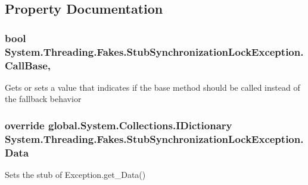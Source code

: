 \subsection{Property Documentation}
\hypertarget{class_system_1_1_threading_1_1_fakes_1_1_stub_synchronization_lock_exception_a0f2850792a01244a327d73f420cf38c0}{
\subsubsection[{Call\-Base}]{\setlength{\rightskip}{0pt plus 5cm}bool System.\-Threading.\-Fakes.\-Stub\-Synchronization\-Lock\-Exception.\-Call\-Base\hspace{0.3cm}{\ttfamily [get]}, {\ttfamily [set]}}}\label{class_system_1_1_threading_1_1_fakes_1_1_stub_synchronization_lock_exception_a0f2850792a01244a327d73f420cf38c0}


Gets or sets a value that indicates if the base method should be called instead of the fallback behavior

\hypertarget{class_system_1_1_threading_1_1_fakes_1_1_stub_synchronization_lock_exception_a7c10b32b6239c528fecbb57819b3ecd9}{
\subsubsection[{Data}]{\setlength{\rightskip}{0pt plus 5cm}override global.\-System.\-Collections.\-I\-Dictionary System.\-Threading.\-Fakes.\-Stub\-Synchronization\-Lock\-Exception.\-Data\hspace{0.3cm}{\ttfamily [get]}}}\label{class_system_1_1_threading_1_1_fakes_1_1_stub_synchronization_lock_exception_a7c10b32b6239c528fecbb57819b3ecd9}


Sets the stub of Exception.\-get\-\_\-\-Data()

